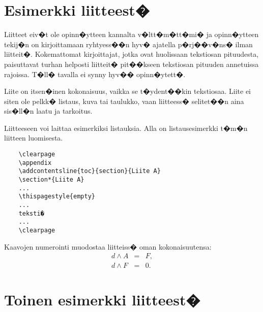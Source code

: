 \documentclass[finnish,12pt,a4paper,pdftex]{article}
\begin{document}
\appendix 

\clearpage
{}
\section{Esimerkki liitteest�\label{LiiteA}}
\renewcommand{\theequation}{A\arabic{equation}}
\setcounter{equation}{0}  
\renewcommand{\thefigure}{A\arabic{figure}}
\setcounter{figure}{0}
\renewcommand{\thetable}{A\arabic{table}}
\setcounter{table}{0}

Liitteet eiv�t ole opinn�ytteen kannalta v�ltt�m�tt�mi� ja 
opinn�ytteen tekij�n on 
kirjoittamaan ryhtyess��n hyv� ajatella p�rj��v�ns� ilman liitteit�.
Kokemattomat kirjoittajat, jotka ovat huolissaan
tekstiosan pituudesta, paisuttavat turhan 
helposti liitteit� pit��kseen tekstiosan pituuden annetuissa rajoissa.
T�ll� tavalla ei synny hyv�� opinn�ytett�.   

Liite on itsen�inen kokonaisuus, vaikka se t�ydent��kin tekstiosaa.
Liite ei siten ole pelkk� listaus, kuva tai taulukko, vaan 
liitteess� selitet��n aina sis�ll�n laatu ja tarkoitus. 

Liitteeseen voi laittaa esimerkiksi listauksia. Alla on 
listausesimerkki t�m�n liitteen luomisesta. 

\begin{verbatim}
	\clearpage
	\appendix
	\addcontentsline{toc}{section}{Liite A}
	\section*{Liite A}
	...
	\thispagestyle{empty}
	...
	teksti�
	...
	\clearpage
\end{verbatim}

Kaavojen numerointi muodostaa liitteiss� oman kokonaisuutensa:
\begin{eqnarray}
d \wedge A  &=& F, \label{liitekaava1}\\
d \wedge F  &=& 0. \label{liitekaava2}
\end{eqnarray}


\clearpage
{}
\section{Toinen esimerkki liitteest�\label{LiiteB}}
\end{document}
